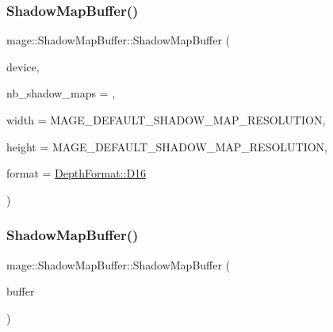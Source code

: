 \subsubsection{\texorpdfstring{Shadow\+Map\+Buffer()}{ShadowMapBuffer()}\hspace{0.1cm}{\footnotesize\ttfamily [2/4]}}
{\footnotesize\ttfamily mage\+::\+Shadow\+Map\+Buffer\+::\+Shadow\+Map\+Buffer (\begin{DoxyParamCaption}\item[{I\+D3\+D11\+Device2 $\ast$}]{device,  }\item[{size\+\_\+t}]{nb\+\_\+shadow\+\_\+maps = {},  }\item[{\hyperlink{namespacemage_a41c104c036fba3756a74e19f793eeaa1}{U32}}]{width = {\ttfamily MAGE\+\_\+DEFAULT\+\_\+SHADOW\+\_\+MAP\+\_\+RESOLUTION},  }\item[{\hyperlink{namespacemage_a41c104c036fba3756a74e19f793eeaa1}{U32}}]{height = {\ttfamily MAGE\+\_\+DEFAULT\+\_\+SHADOW\+\_\+MAP\+\_\+RESOLUTION},  }\item[{\hyperlink{namespacemage_aed4c3f883a30484d0a20762c06be81d4}{Depth\+Format}}]{format = {\ttfamily \hyperlink{namespacemage_aed4c3f883a30484d0a20762c06be81d4a6fd9ec81643ee5a57f85a71951bfe13d}{Depth\+Format\+::\+D16}} }\end{DoxyParamCaption})\hspace{0.3cm}{\ttfamily [explicit]}}

\hypertarget{structmage_1_1_shadow_map_buffer_a276a32f787cda940ac36df461d0ce3ea}{}\label{structmage_1_1_shadow_map_buffer_a276a32f787cda940ac36df461d0ce3ea} 
\subsubsection{\texorpdfstring{Shadow\+Map\+Buffer()}{ShadowMapBuffer()}\hspace{0.1cm}{\footnotesize\ttfamily [3/4]}}
{\footnotesize\ttfamily mage\+::\+Shadow\+Map\+Buffer\+::\+Shadow\+Map\+Buffer (\begin{DoxyParamCaption}\item[{const \hyperlink{structmage_1_1_shadow_map_buffer}{Shadow\+Map\+Buffer} \&}]{buffer }\end{DoxyParamCaption})\hspace{0.3cm}{\ttfamily [delete]}}


